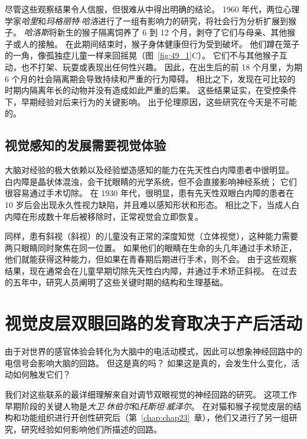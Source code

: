 尽管这些观察结果令人信服，但很难从中得出明确的结论。
1960 年代，两位心理学家\textit{哈里}和\textit{玛格丽特$\cdot$哈洛}进行了一组有影响力的研究，将社会行为分析扩展到猴子。
\textit{哈洛斯}将新生的猴子隔离饲养了 6 到 12 个月，剥夺了它们与母亲、其他猴子或人的接触。
在此期间结束时，猴子身体健康但行为受到破坏。 他们蹲在笼子的一角，像孤独症儿童一样来回摇晃（图~\ref{fig:49_1}C）。
它们不与其他猴子互动，也不打架、玩耍或表现出任何性兴趣。
因此，在出生后的前 18 个月里，为期 6 个月的社会隔离期会导致持续和严重的行为障碍。
相比之下，发现在可比较的时期内隔离年长的动物并没有造成如此严重的后果。
这些结果证实，在受控条件下，早期经验对后来行为的关键影响。
出于伦理原因，这些研究在今天是不可能的。



\subsection{视觉感知的发展需要视觉体验}

大脑对经验的极大依赖以及经验塑造感知的能力在先天性白内障患者中很明显。
白内障是晶状体混浊，会干扰眼睛的光学系统，但不会直接影响神经系统；
它们很容易通过手术切除。
在 1930 年代，很明显，患有先天性双眼白内障的患者在 10 岁后会出现永久性视力缺陷，并且难以感知形状和形态。
相比之下，当成人白内障在形成数十年后被移除时，正常视觉会立即恢复。


同样，患有斜视（斜视）的儿童没有正常的深度知觉（立体视觉），这种能力需要两只眼睛同时聚焦在同一位置。
如果他们的眼睛在生命的头几年通过手术矫正，他们就能获得这种能力，但如果在青春期后期进行手术，则不会。
由于这些观察结果，现在通常会在儿童早期切除先天性白内障，并通过手术矫正斜视。
在过去的五年中，研究人员阐明了这些关键时期的结构和生理基础。



\section{视觉皮层双眼回路的发育取决于产后活动}

由于对世界的感官体验会转化为大脑中的电活动模式，因此可以想象神经回路中的电信号会影响大脑的回路。
但这是真的吗？
如果这是真的，会发生什么变化，活动如何触发它们？


我们对这些联系的最详细理解来自对调节双眼视觉的神经回路的研究。
这项工作早期阶段的关键人物是\textit{大卫$\cdot$休伯尔}和\textit{托斯坦$\cdot$威泽尔}。
在对猫和猴子视觉皮层的结构和功能组织进行开创性研究后（第~\ref{chap:chap23}~章），他们又进行了另一组研究，研究经验如何影响他们所描述的回路。



